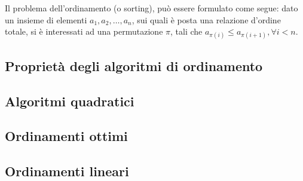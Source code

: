 \documentclass{subfiles}
\begin{document}
Il problema dell'ordinamento (o sorting), può essere formulato come segue: dato un insieme di elementi \(a_{1}, a_{2}, \ldots, a_{n}\), sui quali è posta una relazione d'ordine totale,
si è interessati ad una permutazione \(\pi\), tali che \(a_{\pi(i)} \le a_{\pi(i + 1)}, \forall i < n\).

\subsection{Proprietà degli algoritmi di ordinamento}


\subsection{Algoritmi quadratici}

\clearpage

\subsection{Ordinamenti ottimi}


\subsection{Ordinamenti lineari}

\end{document}
